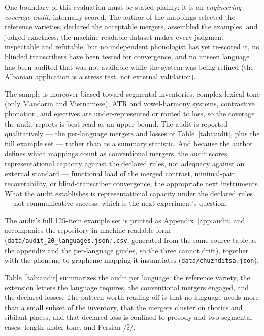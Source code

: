 \documentclass[11pt]{article}
\newcommand{\ph}[1]{{\ipafont/#1/}}
\begin{document}
One boundary of this evaluation must be stated plainly: it is an \emph{engineering coverage audit}, internally scored. The author of the mappings selected the reference varieties, declared the acceptable mergers, assembled the examples, and judged exactness; the machine-readable dataset makes every judgment inspectable and refutable, but no independent phonologist has yet re-scored it, no blinded transcribers have been tested for convergence, and no unseen language has been audited that was not available while the system was being refined (the Albanian application is a stress test, not external validation).

The sample is moreover biased toward segmental inventories: complex lexical tone (only Mandarin and Vietnamese), ATR and vowel-harmony systems, contrastive phonation, and ejectives are under-represented or routed to loss, so the coverage the audit reports is best read as an upper bound. The audit is reported qualitatively — the per-language mergers and losses of Table~\ref{tab:audit}, plus the full example set — rather than as a summary statistic. And because the author defines which mappings count as conventional mergers, the audit scores representational capacity against the declared rules, not adequacy against an external standard — functional load of the merged contrast, minimal-pair recoverability, or blind-transcriber convergence, the appropriate next instruments. What the audit establishes is representational capacity under the declared rules — not communicative success, which is the next experiment's question.

The audit's full 125-item example set is printed as Appendix~\ref{app:audit} and accompanies the repository in machine-readable form (\texttt{data/audit\_20\_languages.json}/\texttt{.csv}, generated from the same source table as the appendix and the per-language guides, so the three cannot drift), together with the phoneme-to-grapheme mapping it instantiates (\texttt{data/chuzhditsa.json}).

Table~\ref{tab:audit} summarizes the audit per language: the reference variety, the extension letters the language requires, the conventional mergers engaged, and the declared losses. The pattern worth reading off is that no language needs more than a small subset of the inventory, that the mergers cluster on rhotics and sibilant places, and that declared loss is confined to prosody and two segmental cases: length under tone, and Persian \ph{ʔ}.
\end{document}
